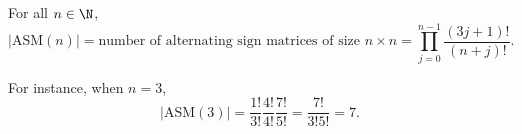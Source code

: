 \documentclass[co439]{subfiles}
\begin{document}
    \rruleline

    \clearpage

    \begin{theorem}{}
        For all $n\in\N$,
        \begin{equation*}
            \left| \text{ASM}\left( n \right) \right| = \text{number of alternating sign matrices of size $n\times n$} = \prod^{n-1}_{j=0} \frac{\left( 3j+1 \right)!}{\left( n+j \right)!}.
        \end{equation*}
    \end{theorem}

    \rruleline

    \np For instance, when $n=3$,
    \begin{equation*}
        \left| \text{ASM}\left( 3 \right) \right| = \frac{1!}{3!} \frac{4!}{4!} \frac{7!}{5!} = \frac{7!}{3!5!} = 7.
    \end{equation*}
\end{document}
